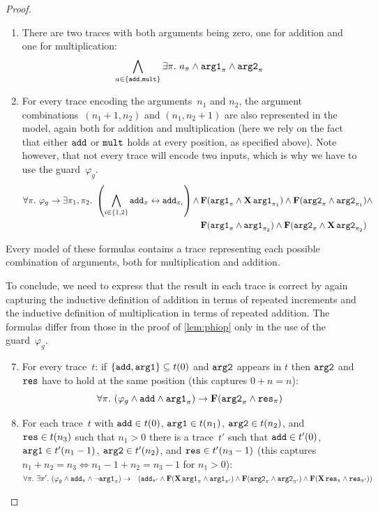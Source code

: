 \documentclass[dvipsnames,10pt,a4paper]{amsart}
\theoremstyle{definition}
\theoremstyle{remark}
\newcommand{\set}[1]{\{#1\}}
\renewcommand{\phi}{\varphi}
\newcommand{\F}{\mathop{\mathbf{F}\vphantom{a}}\nolimits}
\newcommand{\X}{\mathop{\mathbf{X}\vphantom{a}}\nolimits}
\newcommand\argl{\textup{\texttt{arg1}}}
\newcommand\argr{\textup{\texttt{arg2}}}
\newcommand\res{\textup{\texttt{res}}}
\newcommand\add{\textup{\texttt{add}}}
\newcommand\mult{\textup{\texttt{mult}}}
\renewcommand{\phi}{\varphi}
\begin{document}
\begin{proof}
\begin{enumerate}
	\item\label{itemcomplstartcl}
     There are two traces with both arguments being zero, one for addition and one for multiplication:
\[\bigwedge_{a \in \set{\add,\mult}}\exists \pi.\ a_\pi \wedge \argl_\pi \wedge \argr_\pi\]

\item\label{itemcomplstepcl} For every trace encoding the arguments~$n_1$ and $n_2$, the argument combinations~$(n_1+1, n_2)$ and $(n_1, n_2+1)$ are also represented in the model, again both for addition and multiplication (here we rely on the fact that either $\add$ or $\mult$ holds at every position, as specified above). Note however, that not every trace will encode two inputs, which is why we have to use the guard~$\phi_g$.
\begin{align*}
\forall \pi.\ \phi_g \rightarrow  \exists\pi_1, \pi_2.\ \left( \bigwedge_{i \in\set{1,2}} \add_\pi \leftrightarrow \add_{\pi_i} \right)\wedge 
&\F(\argl_\pi \wedge \X\argl_{\pi_1}) \wedge \F(\argr_\pi \wedge \argr_{\pi_1}) \wedge \\
&
\F(\argl_\pi \wedge \argl_{\pi_2}) \wedge \F(\argr_\pi \wedge \X\argr_{\pi_2})	
\end{align*}  
\end{enumerate}	
Every model of these formulas contains a trace representing each possible combination of arguments, both for multiplication and addition. 

To conclude, we need to express that the result in each trace is correct by again capturing the inductive definition of addition in terms of repeated increments and the inductive definition of multiplication in terms of repeated addition.
The formulas differ from those in the proof of \autoref{lem:phiop} only in the use of the guard~$\phi_g$.

	\begin{enumerate}
	  \setcounter{enumi}{6}
	\item\label{itemcorrfirstcl} For every trace~$t$: if $\set{\add,\argl} \subseteq t(0)$ and $\argr$ appears in $t$ then $\argr$ and $\res$ have to hold at the same position (this captures $0 + n = n$):
	\[
	\forall \pi.\ (\phi_g\wedge \add\wedge \argl_\pi ) \rightarrow \F(\argr_\pi \wedge \res_\pi)
	\]
	\item For each trace~$t$ with $\add\in t(0)$, $\argl \in t(n_1)$,
    $\argr \in t(n_2)$, and $\res \in t(n_3)$ such that $n_1 > 0$ there is a trace~$t'$ such that $\add\in t'(0)$, $\argl \in t'(n_1-1)$,
    $\argr \in t'(n_2)$, and $\res \in t'(n_3-1)$ (this captures $n_1 + n_2 = n_3 \Leftrightarrow n_1-1 + n_2 = n_3-1$ for $n_1 > 0$):
    \\[.5em]$\displaystyle
        \forall \pi.\ \exists\pi'.\ (\phi_g\wedge\add_\pi \wedge \neg \argl_\pi) \rightarrow \\\phantom{x}\hfill
        \left(\add_{\pi'} \wedge  \F( \X\argl_{\pi} \wedge \argl_{\pi'} ) \wedge \F(\argr_\pi \wedge \argr_{\pi'}) \wedge \F(\X\res_{\pi} \wedge \res_{\pi'}) \right)$\\[-,5em]
    

\end{enumerate}
\end{proof}
\end{document}
